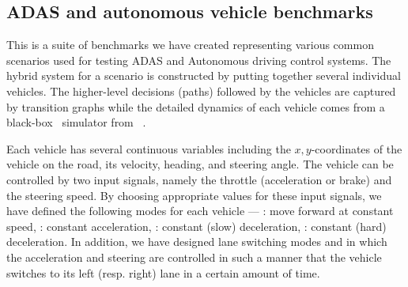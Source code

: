 
\subsection{ADAS and autonomous vehicle benchmarks}
\label{ssec:adas}
This is a suite of benchmarks we have created representing various common scenarios used for testing ADAS and Autonomous driving control systems. 
%
The hybrid system for a scenario is  constructed by putting together several individual vehicles.
The higher-level decisions (paths) followed by the vehicles are captured by transition graphs
while the detailed dynamics of each vehicle comes from a black-box 
\Simulink \ simulator from \Mathworks~\cite{simulinkcar}.

Each vehicle has several continuous variables including the $x,
y$-coordinates of the vehicle on the road, its velocity, heading, and
steering angle. The vehicle can be controlled by two input signals,
namely the throttle (acceleration or brake) and the steering speed.
%
By choosing appropriate values for these input signals, we have
defined the following modes for each vehicle ---
: move forward at constant speed, 
: constant acceleration,
: constant (slow) deceleration,
: constant (hard) deceleration.
In addition, we have designed lane switching modes  and  in which the acceleration and steering are controlled in such a manner that the vehicle switches to its left (resp. right) lane in a certain amount of time. 

